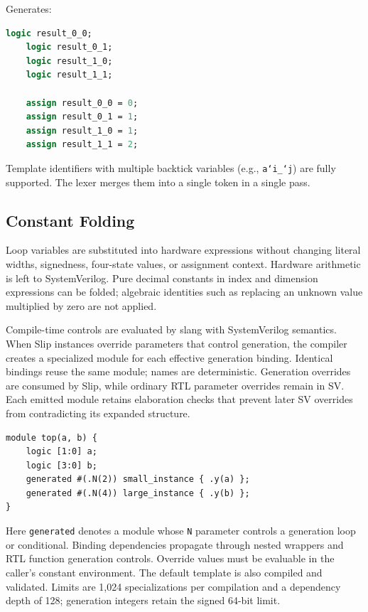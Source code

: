\documentclass[lang=en,11pt]{elegantbook}
\newcommand{\code}[1]{\texttt{#1}}
\begin{document}
Generates:

\begin{lstlisting}[language=SystemVerilog]
    logic result_0_0;
    logic result_0_1;
    logic result_1_0;
    logic result_1_1;

    assign result_0_0 = 0;
    assign result_0_1 = 1;
    assign result_1_0 = 1;
    assign result_1_1 = 2;
\end{lstlisting}

Template identifiers with multiple backtick variables (e.g., \code{a`i\_`j}) are fully supported. The lexer merges them into a single token in a single pass.

\subsection{Constant Folding}

\label{sec:constant-folding}

Loop variables are substituted into hardware expressions without changing literal widths, signedness, four-state values, or assignment context. Hardware arithmetic is left to SystemVerilog. Pure decimal constants in index and dimension expressions can be folded; algebraic identities such as replacing an unknown value multiplied by zero are not applied.

Compile-time controls are evaluated by slang with SystemVerilog semantics.
When Slip instances override parameters that control generation, the compiler
creates a specialized module for each effective generation binding. Identical
bindings reuse the same module; names are deterministic. Generation overrides
are consumed by Slip, while ordinary RTL parameter overrides remain in SV.
Each emitted module retains elaboration checks that prevent later SV overrides
from contradicting its expanded structure.

\begin{lstlisting}[language=Slip]
module top(a, b) {
    logic [1:0] a;
    logic [3:0] b;
    generated #(.N(2)) small_instance { .y(a) };
    generated #(.N(4)) large_instance { .y(b) };
}
\end{lstlisting}

Here \code{generated} denotes a module whose \code{N} parameter controls a
generation loop or conditional. Binding dependencies propagate through nested
wrappers and RTL function generation controls. Override values must be evaluable
in the caller's constant environment. The default template is also compiled and
validated. Limits are 1,024 specializations per compilation and a dependency
depth of 128; generation integers retain the signed 64-bit limit.
\end{document}
